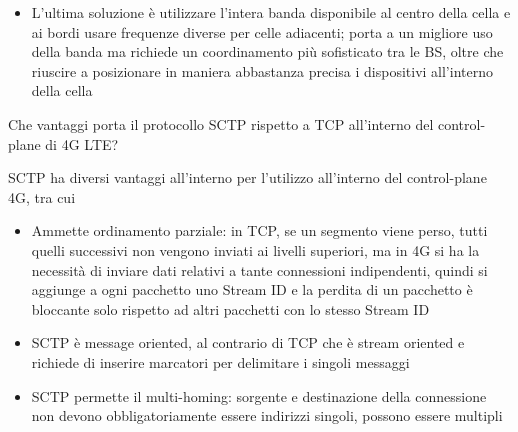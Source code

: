 \begin{questions}
\begin{solution}
\begin{itemize}
            \item L'ultima soluzione è utilizzare l'intera banda disponibile al centro della cella e ai bordi usare frequenze diverse per celle adiacenti; porta a un migliore uso della banda ma richiede un coordinamento più sofisticato tra le BS, oltre che riuscire a posizionare in maniera abbastanza precisa i dispositivi all'interno della cella
        \end{itemize}
    \end{solution}
    
    \question Che vantaggi porta il protocollo SCTP rispetto a TCP all'interno del control-plane di 4G LTE?
    
    \begin{solution}
        SCTP ha diversi vantaggi all'interno per l'utilizzo all'interno del control-plane 4G, tra cui
        \begin{itemize}
            \item Ammette ordinamento parziale: in TCP, se un segmento viene perso, tutti quelli successivi non vengono inviati ai livelli superiori, ma in 4G si ha la necessità di inviare dati relativi a tante connessioni indipendenti, quindi si aggiunge a ogni pacchetto uno Stream ID e la perdita di un pacchetto è bloccante solo rispetto ad altri pacchetti con lo stesso Stream ID
            
            \item SCTP è message oriented, al contrario di TCP che è stream oriented e richiede di inserire marcatori per delimitare i singoli messaggi
            
            \item SCTP permette il multi-homing: sorgente e destinazione della connessione non devono obbligatoriamente essere indirizzi singoli, possono essere multipli
        \end{itemize}
    \end{solution}
\end{questions}